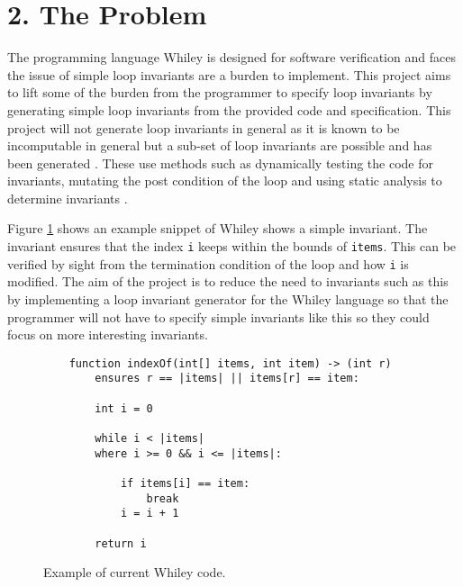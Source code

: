 \documentclass[11pt, a4paper, twoside, openright]{report}
\newcommand{\code}[1]{\texttt{#1}}
\begin{document}
\section*{2. The Problem}




The programming language Whiley is designed for software verification \cite{whiley-design} and
faces the issue of simple loop invariants are a burden to implement.
This project aims to lift some of the burden from the programmer to specify loop invariants
by generating simple loop invariants from the provided code and specification.
This project will not generate loop invariants in general as it is known to be incomputable
in general but a sub-set of loop invariants are possible and has been generated \cite{infer-dynamic} \cite{infer-postconditions}.
These use methods such as dynamically testing the code for invariants, mutating the post condition of the loop
and using static analysis to determine invariants \cite{infer-dynamic} \cite{infer-postconditions}.

Figure \ref{fig:whiley-ex-1} shows an example snippet of Whiley shows a simple invariant.
The invariant ensures that the index \code{i} keeps within the bounds of \code{items}.
This can be verified by sight from the termination condition of the loop and how \code{i} is modified.
The aim of the project is to reduce the need to invariants such as this by implementing
a loop invariant generator for the Whiley language so that the programmer will not have
to specify simple invariants like this so they could focus on more interesting invariants.

\begin{figure}[h]
    \begin{lstlisting}
    function indexOf(int[] items, int item) -> (int r)
        ensures r == |items| || items[r] == item:

        int i = 0

        while i < |items|
        where i >= 0 && i <= |items|:

            if items[i] == item:
                break
            i = i + 1

        return i
    \end{lstlisting}
    \caption{Example of current Whiley code.}
    \label{fig:whiley-ex-1}
\end{figure}
\end{document}

